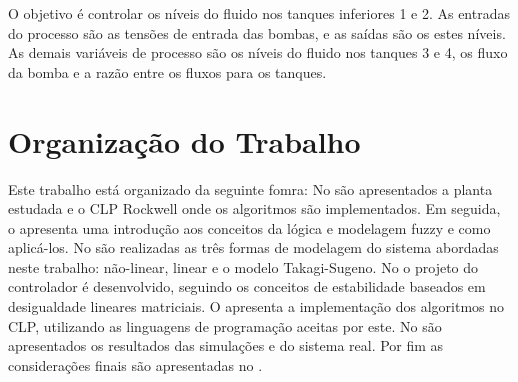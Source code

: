 O objetivo é controlar os níveis do fluido nos tanques inferiores 1 e 2. As entradas do processo são as tensões de entrada das bombas, e as saídas são os estes níveis. As demais variáveis de processo são os níveis do fluido nos tanques 3 e 4, os fluxo da bomba e a razão entre os fluxos para os tanques. 

\section{Organização do Trabalho}
Este trabalho está organizado da seguinte fomra: No  são apresentados a planta estudada e o CLP Rockwell onde os algoritmos são implementados. Em seguida, o  apresenta uma introdução aos conceitos da lógica e modelagem fuzzy e como aplicá-los. No  são realizadas as três formas de modelagem do sistema abordadas neste trabalho: não-linear, linear e o modelo Takagi-Sugeno. No  o projeto do controlador é desenvolvido, seguindo os conceitos de estabilidade baseados em desigualdade lineares matriciais. O  apresenta a implementação dos algoritmos no CLP, utilizando as linguagens de programação aceitas por este. No  são apresentados os resultados das simulações e do sistema real. Por fim as considerações finais são apresentadas no .


%

